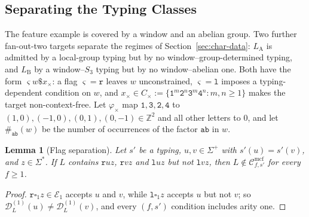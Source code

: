 \documentclass[11pt]{article}
\numberwithin{equation}{section}
\theoremstyle{plain}
\newtheorem{lemma}[theorem]{Lemma}
\theoremstyle{definition}
\theoremstyle{remark}
\newcommand{\Cmcf}[2]{\mathcal{C}^{\mathrm{mcf}}_{#1,#2}}
\newcommand{\D}{\mathcal{D}}
\newcommand{\blank}{\square}
\begin{document}
\subsection{Separating the Typing Classes}
\label{subsec:necessity}

The feature example is covered by a window and an abelian group.  Two further
fan-out-two targets separate the regimes of Section~\ref{sec:char-data}: $L_{\mathrm A}$
is admitted by a local-group typing but by no window--group-determined typing, and
$L_{\mathrm B}$ by a window--$S_3$ typing but by no window--abelian one.  Both have
the form $\varsigma w\mathtt\$x_\times$: a flag $\varsigma=\mathtt r$ leaves $w$ unconstrained,
$\varsigma=\mathtt l$ imposes a typing-dependent condition on $w$, and
$x_\times\in C_\times:=\{\mathtt{1}^m\mathtt{2}^n\mathtt{3}^m\mathtt{4}^n:m,n\ge1\}$ makes the
target non-context-free.  Let $\varphi_\times$ map
$\mathtt 1,\mathtt 3,\mathtt 2,\mathtt 4$ to $(1,0),(-1,0),(0,1),(0,-1)\in\mathbb Z^2$
and all other letters to $0$, and let $\#_{\mathtt{ab}}(w)$ be the number of
occurrences of the factor $\mathtt{ab}$ in $w$.

\begin{lemma}[Flag separation]
\label{lem:flag-separation}
Let $s'$ be a typing, $u,v\in\Sigma^+$ with $s'(u)=s'(v)$, and $z\in\Sigma^*$.  If $L$
contains $\mathtt ruz$, $\mathtt rvz$ and $\mathtt luz$ but not $\mathtt lvz$, then
$L\notin\Cmcf{f}{s'}$ for every $f\ge1$.
\end{lemma}

\begin{proof}
$\mathtt r\blank_1z\in\mathcal E_1$ accepts $u$ and $v$, while $\mathtt l\blank_1z$
accepts $u$ but not $v$; so $\D^{(1)}_L(u)\ne\D^{(1)}_L(v)$, and every $(f,s')$
condition includes arity one.
\end{proof}
\end{document}
